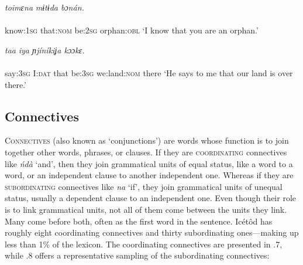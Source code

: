 \ea\label{ex:}
   \textit{toimɛna}\textit{   mɨtɨda   bɔnán.} \\
    \\
know:\textsc{1sg}   that:\textsc{nom}   be:\textsc{2sg}   orphan:\textsc{obl}
\glt ‘I know that you are an orphan.’ 
\z




\ea\label{ex:}
   \textit{taa}\textit{   iya     ɲjíníkiʝa    kɔɔkɛ.} \\
    \\
say:\textsc{3sg}   I:\textsc{dat}   that   be:\textsc{3sg}  we:land:\textsc{nom} there
\glt ‘He says to me that our land is over there.’ 
\z






\subsection{Connectives}


\textsc{Connectives} (also known as ‘conjunctions’) are words whose function is to join together other words, phrases, or clauses. If they are \textsc{coordinating} connectives like \textit{ńdà} ‘and’, then they join grammatical units of equal status, like a word to a word, or an independent clause to another independent one. Whereas if they are \textsc{subordinating} connectives like \textit{na} ‘if’, they join grammatical units of unequal status, usually a dependent clause to an independent one. Even though their role is to link grammatical units, not all of them come between the units they link. Many come before both, often as the first word in the sentence. Icétôd has roughly eight coordinating connectives and thirty subordinating ones—making up less than 1\% of the lexicon. The coordinating connectives are presented in .7, while .8 offers a representative sampling of the subordinating connectives:


